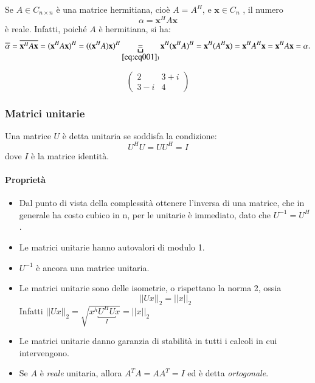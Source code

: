 \begin{property}

Se $A \in  C_{n \times n}$ \`e una matrice hermitiana,
 cio\`e $A = A^{H}$, e $\mathbf{x} \in C_n$ , il  numero 
$$ \alpha =  \mathbf{x}^{H} A \mathbf{x}$$
\`e reale. Infatti, poich\'e  $A$ \`e hermitiana, si ha:
$$\overline{\alpha}  = \overline{\mathbf{x}^{H} A\mathbf{x}} =
 (\mathbf{x}^H A\mathbf{x})^H = 
 ((\mathbf{x}^H A)\mathbf{x})^H \underbracket{=}_{\ref{eq:eq001})} 
 \mathbf{x}^{H}(\mathbf{x}^{H}A)^{H} = 
\mathbf{x}^{H}(A^{H}\mathbf{x})=
 \mathbf{x}^H A^{H} \mathbf{x} = \mathbf{x}^H A\mathbf{x}  = \alpha.$$
\end{property}

\begin{example}
$$\begin{pmatrix}
  2   & 3+i \\
  3-i & 4
\end{pmatrix}$$
\end{example}

\subsubsection{Matrici unitarie}
\begin{defn}
  Una matrice $U$ \`e detta unitaria se soddisfa la condizione:
  $$U^H U = U U^H = I$$
  dove $I$ \`e la matrice identità.
\end{defn}

\paragraph{Proprietà}
\label{prop:unitarie}
\begin{itemize}
\item Dal punto di vista della complessità ottenere l'inversa
  di una matrice, che in generale ha costo cubico in n, per le
  unitarie \`e immediato, dato che $ U^{-1} = U^{H} $.
\item Le matrici unitarie hanno autovalori di modulo 1.
\item $U^{-1}$ \`e ancora una matrice unitaria.
\item Le matrici unitarie sono delle isometrie, o rispettano la norma
  2, ossia
  $$||Ux||_{2} = ||x||_{2}$$ 
  Infatti $|| Ux ||_{2} = \sqrt{x^{h}\underbracket{U^{H}U}_{I}x} = ||x||_{2}$
\item Le matrici unitarie danno garanzia di stabilità in tutti i
  calcoli in cui intervengono.
\item Se $A$ \`e \emph{reale} unitaria, allora $A^{T}A = AA^{T} = I$ ed
  \`e detta \emph{ortogonale}.
\end{itemize}

